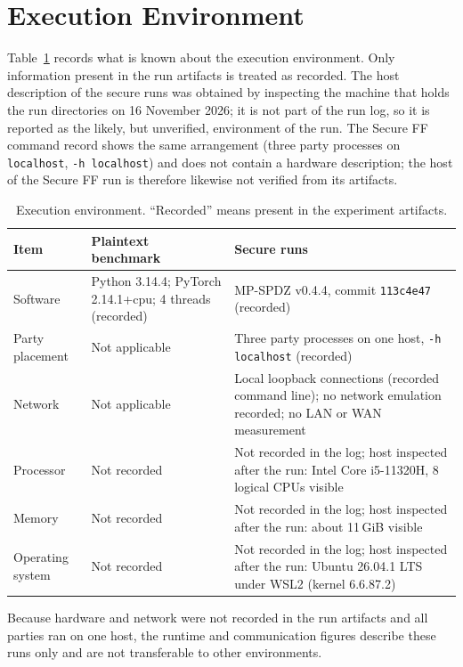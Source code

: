\section{Execution Environment}\label{sec:setup-env}
Table~\ref{tab:setup-env} records what is known about the execution environment. Only information present in the run artifacts is treated as recorded. The host description of the secure runs was obtained by inspecting the machine that holds the run directories on 16 November 2026; it is not part of the run log, so it is reported as the likely, but unverified, environment of the run. The Secure FF command record shows the same arrangement (three party processes on \texttt{localhost}, \texttt{-h localhost}) and does not contain a hardware description; the host of the Secure FF run is therefore likewise not verified from its artifacts.

\begin{table}[ht]
\centering
\small
\begin{tabular}{@{}>{\raggedright\arraybackslash}p{3.6cm}>{\raggedright\arraybackslash}p{4.8cm}>{\raggedright\arraybackslash}p{5.4cm}@{}}
\toprule
Item & Plaintext benchmark & Secure runs \\
\midrule
Software & Python 3.14.4; PyTorch 2.14.1+cpu; 4 threads (recorded) & MP-SPDZ v0.4.4, commit \texttt{113c4e47} (recorded) \\
Party placement & Not applicable & Three party processes on one host, \texttt{-h localhost} (recorded) \\
Network & Not applicable & Local loopback connections (recorded command line); no network emulation recorded; no LAN or WAN measurement \\
Processor & Not recorded & Not recorded in the log; host inspected after the run: Intel Core i5-11320H, 8 logical CPUs visible \\
Memory & Not recorded & Not recorded in the log; host inspected after the run: about 11\,GiB visible \\
Operating system & Not recorded & Not recorded in the log; host inspected after the run: Ubuntu 26.04.1 LTS under WSL2 (kernel 6.6.87.2) \\
\bottomrule
\end{tabular}
\caption{Execution environment. ``Recorded'' means present in the experiment artifacts.}
\label{tab:setup-env}
\end{table}

Because hardware and network were not recorded in the run artifacts and all parties ran on one host, the runtime and communication figures describe these runs only and are not transferable to other environments.
